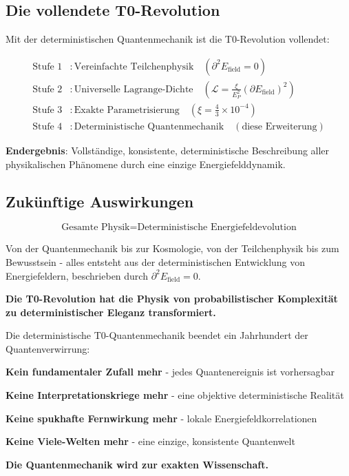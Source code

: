 \documentclass[12pt,a4paper]{article}
\newcommand{\xipar}{\xi}
\newcommand{\EPlanck}{E_P}
\theoremstyle{definition}
\theoremstyle{remark}
\begin{document}
\subsection{Die vollendete T0-Revolution}

Mit der deterministischen Quantenmechanik ist die T0-Revolution vollendet:

\begin{align}
	\text{Stufe 1} &: \text{Vereinfachte Teilchenphysik} \quad (\partial^2 E_{\text{field}} = 0) \\
	\text{Stufe 2} &: \text{Universelle Lagrange-Dichte} \quad (\mathcal{L} = \frac{\xipar}{\EPlanck^2} (\partial E_{\text{field}})^2) \\
	\text{Stufe 3} &: \text{Exakte Parametrisierung} \quad (\xipar = \frac{4}{3} \times 10^{-4}) \\
	\text{Stufe 4} &: \text{Deterministische Quantenmechanik} \quad (\text{diese Erweiterung})
\end{align}

\textbf{Endergebnis}: Vollst{\"a}ndige, konsistente, deterministische Beschreibung aller physikalischen Ph{\"a}nomene durch eine einzige Energiefelddynamik.

\subsection{Zuk{\"u}nftige Auswirkungen}

\begin{equation}
	\boxed{\text{Gesamte Physik} = \text{Deterministische Energiefeldevolution}}
\end{equation}

Von der Quantenmechanik bis zur Kosmologie, von der Teilchenphysik bis zum Bewusstsein - alles entsteht aus der deterministischen Entwicklung von Energiefeldern, beschrieben durch $\partial^2 E_{\text{field}} = 0$.

\textbf{Die T0-Revolution hat die Physik von probabilistischer Komplexit{\"a}t zu deterministischer Eleganz transformiert.}

\begin{tcolorbox}[colback=purple!5!white,colframe=purple!75!black,title=Das Ende der Quantenmystik]
	Die deterministische T0-Quantenmechanik beendet ein Jahrhundert der Quantenverwirrung:
	
	\textbf{Kein fundamentaler Zufall mehr} - jedes Quantenereignis ist vorhersagbar
	
	\textbf{Keine Interpretationskriege mehr} - eine objektive deterministische Realit{\"a}t
	
	\textbf{Keine spukhafte Fernwirkung mehr} - lokale Energiefeldkorrelationen
	
	\textbf{Keine Viele-Welten mehr} - eine einzige, konsistente Quantenwelt
	
	\textbf{Die Quantenmechanik wird zur exakten Wissenschaft.}
\end{tcolorbox}
\end{document}
